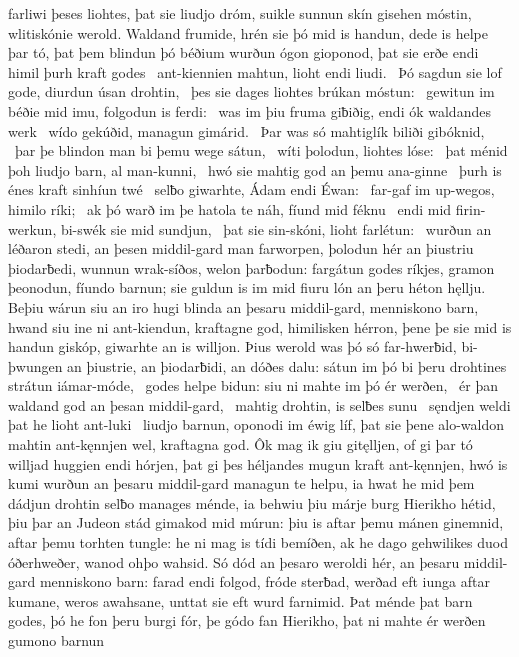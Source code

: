 farliwi þeses liohtes, þat sie liudjo dróm,
suikle sunnun skín gisehen móstin,
wlitiskónie werold. Waldand frumide,
hrén sie þó mid is handun, dede is helpe þar tó,
þat þem blindun þó béðium wurðun
ógon gioponod, þat sie erðe endi himil
þurh kraft godes \hld\ ant-kiennien mahtun,
lioht endi liudi. \hld\ Þó sagdun sie lof gode,
diurdun úsan drohtin, \hld\ þes sie dages liohtes
brúkan móstun: \hld\ gewitun im béðie mid imu,
folgodun is ferdi: \hld\ was im þiu fruma giƀiðig,
endi ók waldandes werk \hld\ wído gekúðid,
managun gimárid. \hld\ Þar was só mahtiglík
biliði gibóknid, \hld\ þar þe blindon man
bi þemu wege sátun, \hld\ wíti þolodun,
liohtes lóse: \hld\ þat ménid þoh liudjo barn,
al man-kunni, \hld\ hwó sie mahtig god
an þemu ana-ginne \hld\ þurh is énes kraft
sinhíun twé \hld\ selƀo giwarhte,
Ádam endi Éwan: \hld\ far-gaf im up-wegos,
himilo ríki; \hld\ ak þó warð im þe hatola te náh,
fíund mid féknu \hld\ endi mid firin-werkun,
bi-swék sie mid sundjun, \hld\ þat sie sin-skóni,
lioht farlétun: \hld\ wurðun an léðaron stedi,
an þesen middil-gard man farworpen,
þolodun hér an þiustriu þiodarƀedi,
wunnun wrak-síðos, welon þarƀodun:
fargátun godes ríkjes, gramon þeonodun,
fíundo barnun; sie guldun is im mid fiuru lón
an þeru héton hęllju. Beþiu wárun siu an iro hugi blinda
an þesaru middil-gard, menniskono barn,
hwand siu ine ni ant-kiendun, kraftagne god,
himilisken hérron, þene þe sie mid is handun giskóp,
giwarhte an is willjon. Þius werold was þó só far-hwerƀid,
bi-þwungen an þiustrie, an þiodarƀidi,
an dóðes dalu: sátun im þó bi þeru drohtines strátun
iámar-móde, \hld\ godes helpe bidun:
siu ni mahte im þó ér werðen, \hld\ ér þan waldand god
an þesan middil-gard, \hld\ mahtig drohtin,
is selƀes sunu \hld\ sęndjen weldi
þat he lioht ant-luki \hld\ liudjo barnun,
oponodi im éwig líf, þat sie þene alo-waldon
mahtin ant-kęnnjen wel, kraftagna god.
Ôk mag ik giu gitęlljen, of gi þar tó willjad
huggien endi hórjen, þat gi þes héljandes mugun
kraft ant-kęnnjen, hwó is kumi wurðun
an þesaru middil-gard managun te helpu,
ia hwat he mid þem dádjun drohtin selƀo
manages ménde, ia behwiu þiu márje burg
Hierikho hétid, þiu þar an Judeon stád
gimakod mid múrun: þiu is aftar þemu mánen ginemnid,
aftar þemu torhten tungle: he ni mag is tídi bemíðen,
ak he dago gehwilikes duod óðerhweðer,
wanod ohþo wahsid. Só dód an þesaro weroldi hér,
an þesaru middil-gard menniskono barn:
farad endi folgod, fróde sterƀad,
werðad eft iunga aftar kumane,
weros awahsane, unttat sie eft wurd farnimid.
Þat ménde þat barn godes, þó he fon þeru burgi fór,
þe gódo fan Hierikho, þat ni mahte ér werðen gumono barnun

